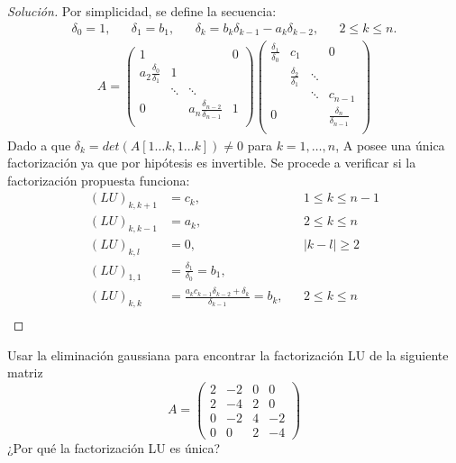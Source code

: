 \documentclass[12pt]{book}
\newcommand\abs[1]{\left\lvert#1\right\rvert}
\newenvironment{solucion}
  {\renewcommand\qedsymbol{$\square$}\begin{proof}[Solución]}
  {\end{proof}}
\begin{document}
\begin{solucion}
    Por simplicidad, se define la secuencia:
    \begin{align*}
        \delta_0=1,& &\delta_1=b_1,& &\delta_k=b_k\delta_{k-1}-a_k\delta_{k-2},& &2\leq k \leq n. 
    \end{align*}
    \begin{align*}
        A=\begin{pmatrix}
        1   &   &   & 0\\
        a_2\frac{\delta_0}{\delta_1} & 1 &   &  \\
            &\ddots &\ddots   &  \\
        0   &   &a_n\frac{\delta_{n-2}}{\delta_{n-1}}& 1\\
        \end{pmatrix}\begin{pmatrix}
        \frac{\delta_1}{\delta_0}   & c_1  &   & 0\\
            & \frac{\delta_2}{\delta_1} & \ddots  &  \\
            &       &\ddots   &c_{n-1}  \\
        0   &   &   & \frac{\delta_n}{\delta_{n-1}}\\
        \end{pmatrix}
    \end{align*}
    Dado a que $\delta_k=det(A[1\dots k,1\dots k])\neq 0$ para $k=1,\dots,n$, A posee una única factorización ya que por hipótesis es invertible. Se procede a verificar si la factorización propuesta funciona:
    \begin{align*}
        (LU)_{k,k+1}&=c_k, & & 1\leq k\leq n-1\\
        (LU)_{k,k-1}&=a_k, & & 2\leq k\leq n\\
        (LU)_{k,l}&=0, & &  \abs{k-l}\geq 2\\
        (LU)_{1,1}&=\frac{\delta_1}{\delta_0}=b_1, \\
        (LU)_{k,k}&=\frac{a_kc_{k-1}\delta_{k-2}+\delta_k}{\delta_{k-1}}=b_k, & & 2\leq k\leq n\\
    \end{align*}
    
\end{solucion}

\eje Usar la eliminación gaussiana para encontrar la factorización LU de la siguiente matriz
\[A=\begin{pmatrix}
2&-2&0&0\\
2&-4&2&0\\
0&-2&4&-2\\
0&0&2&-4
\end{pmatrix}\]
¿Por qué la factorización LU es única?
\end{document}
